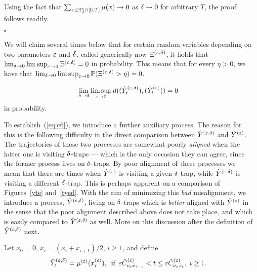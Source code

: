 
Using the fact that 
$\sum_{x\in{\mathfrak T}_{\delta}^c\cap[0,T]}\mu(x)\to0$ as $\delta\to0$ for arbitrary $T$,
the proof follows readily.

$\square$




We will claim several times below that for certain random variables depending on two parameters $\varepsilon$ and $\delta$,
called generically now $\Xi^{(\varepsilon,\delta)}$, it holds that $\lim_{\delta\to0}\limsup_{\varepsilon\to0}\Xi^{(\varepsilon,\delta)}=0$
in probability. This means that for every $\eta>0$, we have that
$\lim_{\delta\to0}\limsup_{\varepsilon\to0}{\mathbb P}(\Xi^{(\varepsilon,\delta)}>\eta)=0$.





\begin{lm}
\label{lm:conv2}
\begin{equation}
\label{eq:c6}
\lim_{\delta\to0}\limsup_{\eps\to0}d((\byed_t),(\hye_t))=0
\end{equation}
in probability. 
\end{lm}




To establish~(\ref{eq:c6}), we introduce a further auxiliary process. The reason for this is the following
difficulty in the direct comparison between $\hat Y^{(\varepsilon,\delta)}$ and $\hat Y^{(\varepsilon)}$. The trajectories of those two processes are
somewhat poorly {\em aligned} when the latter one is visiting $\delta$-traps --- which is the only occasion they 
can agree, since the former process lives on $\delta$-traps. By poor alignment of these processes we mean that 
there are times when $\hat Y^{(\varepsilon)}$ is visiting
a given $\delta$-trap, while $\hat Y^{(\varepsilon,\delta)}$ is 
visiting a different $\delta$-trap.
This is perhaps apparent on a comparison of Figures~\ref{yte} and~\ref{tyed}.
With the aim of minimizing this {\em bad} misalignment, we introduce a process,
$\bar Y^{(\varepsilon,\delta)}$, living on $\delta$-traps which is {\em better} aligned with $\hat Y^{(\varepsilon)}$ in the sense that the poor alignment 
described above does not take place, and which is easily compared to $\hat Y^{(\varepsilon,\delta)}$ as well. More on this discussion 
after the definition of $\bar Y^{(\varepsilon,\delta)}$ next.


Let  $\bar x_0=0$, $\bar x_i=(x_i+x_{i+1})/2$, $i\geq1$, and define
\begin{equation}
\label{eq:vyed}
\vyed_t=\mue(\xe_i),\,\mbox{ if }\, \eps\bce_{\nu_\eps\bar x_{i-1}}<t\leq\eps\bce_{\nu_\eps\bar x_{i}},\,\,i\geq1.
\end{equation}

